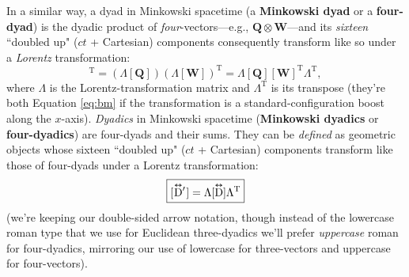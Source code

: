 \documentclass[12pt]{article}
\renewcommand{\vv}[1]{\mathbf{#1}}
\newcommand{\capdy}[1]{ \overset{ \text{\tiny$\bm\leftrightarrow$} }{\vphantom{\text{\small{A}}}\smash{#1}} }
\begin{document}
In a similar way, a dyad in Minkowski spacetime (a \textbf{Minkowski dyad} or a \textbf{four-dyad}) is the dyadic product of \emph{four}-vectors---e.g., $\vv Q \otimes \vv W$---and its \emph{sixteen} ``doubled up" ($ct$ + Cartesian) components consequently transform like so under a \emph{Lorentz} transformation:
\begin{equation*}
[\vv Q^\prime \mkern1mu ] [\vv W^\prime \mkern1mu ]^{\mathrm{T}} = ( \Lambda [\vv Q] ) ( \Lambda [\vv W] )^\mathrm{T} = \Lambda [\vv Q] [\vv W]^{\mathrm{T}} \Lambda^{\mathrm{T}} ,
\end{equation*}
where $\Lambda$ is the Lorentz-transformation matrix and $\Lambda^{\mathrm{T}}$ is its transpose (they're both Equation \ref{eq:bm} if the transformation is a standard-configuration boost along the $x$-axis). \emph{Dyadics} in Minkowski spacetime (\textbf{Minkowski dyadics} or \textbf{four-dyadics}) are four-dyads and their sums. They can be \emph{defined} as geometric objects whose sixteen ``doubled up" ($ct$ + Cartesian) components transform like those of four-dyads under a Lorentz transformation:
\begin{equation}\label{eq:ltd}
\boxed{ [ \mkern1mu {\capdy{\mathrm{D}} {\vphantom{D}}^\prime} \mkern1mu ] = \Lambda [ \capdy{\mathrm{D}} ] \Lambda^{\mathrm{T}}}
\end{equation}
(we're keeping our double-sided arrow notation, though instead of the lowercase roman type that we use for Euclidean three-dyadics we'll prefer \emph{uppercase} roman for four-dyadics, mirroring our use of lowercase for three-vectors and uppercase for four-vectors).
\end{document}
